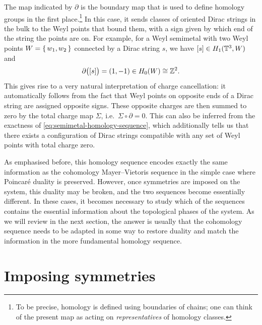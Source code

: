 The map indicated by $\partial$ is the boundary map that is used to define homology groups in the first place.\footnote{
	To be precise, homology is defined using boundaries of chains; one can think of the present map as acting on \emph{representatives} of homology classes.}
In this case, it sends classes of oriented Dirac strings in the bulk to the Weyl points that bound them, with a sign given by which end of the string the points are on. For example, for a Weyl semimetal with two Weyl points $W = \set{w_1,w_2}$ connected by a Dirac string $s$, we have $[s]\in H_1(\mathbb{T}^3,W)$ and
\begin{equation*}
	\partial\big([s]\big) = (1, -1)\in H_0(W)\cong\mathbb{Z}^2. 
\end{equation*}
This gives rise to a very natural interpretation of charge cancellation: it automatically follows from the fact that Weyl points on opposite ends of a Dirac string are assigned opposite signs. These opposite charges are then summed to zero by the total charge map $\Sigma$, i.e.\ $\Sigma\circ\partial = 0$. This can also be inferred from the exactness of \eqref{eq:semimetal-homology-sequence}, which additionally tells us that there exists a configuration of Dirac strings compatible with any set of Weyl points with total charge zero.

As emphasised before, this homology sequence encodes exactly the same information as the cohomology Mayer--Vietoris sequence in the simple case where Poincaré duality is preserved. However, once symmetries are imposed on the system, this duality may be broken, and the two sequences become essentially different. In these cases, it becomes necessary to study which of the sequences contains the essential information about the topological phases of the system. As we will review in the next section, the answer is usually that the cohomology sequence needs to be adapted in some way to restore duality and match the information in the more fundamental homology sequence.

\section{Imposing symmetries}\label{sec:T-WSMs}

